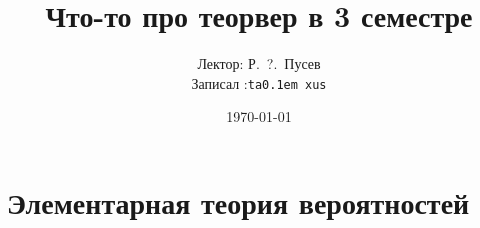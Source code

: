 \documentclass[12pt,timbord]{../notes}
\title{Что-то про теорвер в 3 семестре}
\date{\today}
\author{Лектор: Р.~?.~Пусев \\
Записал :\texttt{ta\lower 0.1em \hbox{x}us}}
\begin{document}
 
\maketitle
\tableofcontents
\clearpage

\chapter{Элементарная теория вероятностей}


% 





\end{document}
